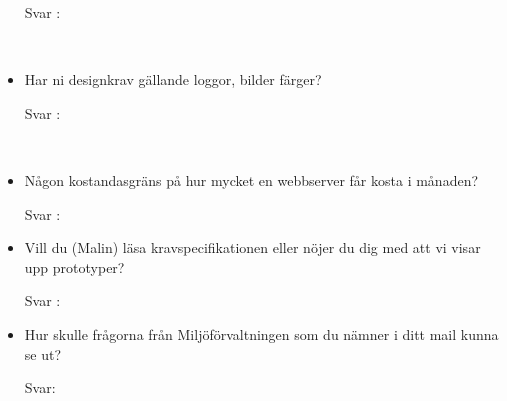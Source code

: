 \documentclass{article}
\begin{document}
\begin{itemize}
        \begin{description}
            \item[Svar :]
        \end{description}
    \\
    \item  Har ni designkrav gällande loggor, bilder färger?
     \begin{description}
            \item[Svar :]
        \end{description}
    \\
    \item Någon kostandasgräns på hur mycket en webbserver får kosta i månaden?
        \begin{description}
            \item[Svar :]
        \end{description}
        \item Vill du (Malin) läsa kravspecifikationen
        eller nöjer du dig med att vi visar upp
        prototyper?
         \begin{description}
            \item[Svar :]
        \end{description}

        \item Hur skulle frågorna från Miljöförvaltningen som du nämner i ditt mail kunna se ut?
        \begin{description}
        	\item[Svar:]
\end{description}        	
        \
    \\
\end{itemize}
\end{document}
